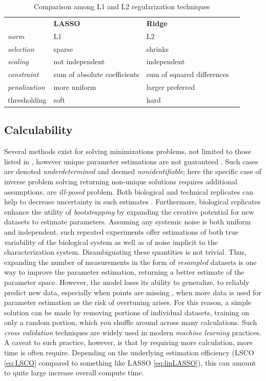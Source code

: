 \begin{table}[H]
\begin{tabular}{|l|l|l|l}
\cline{1-3}
 & \textbf{LASSO} &  \textbf{Ridge} &  \\ \cline{1-3}
\textit{norm} & L1 &  L2 &  \\ \cline{1-3}
\textit{selection} & sparse  & shrinks &  \\ \cline{1-3}
\textit{scaling} & not independent &  independent &  \\ \cline{1-3}
\textit{constraint} &sum of absolute coefficients& sum of squared differences&  \\ \cline{1-3}
\textit{penalization} & more uniform &  larger preferred &  \\ \cline{1-3}
thresholding & soft &  hard &  \\ \cline{1-3}
\end{tabular}
\caption{Comparison among L1 and L2 regularization techniques}
\label{table:regularization}
\end{table}

\subsection{Calculability}
\label{sec:calc}
Several methods exist for solving minimizations problems, not limited to those listed in , however unique parameter estimations are not guaranteed \citep{candes2009near}. Such cases are denoted \emph{underdetermined} and deemed \emph{nonidentifiable}; here the specific case of inverse problem solving returning non-unique solutions requires additional assumptions, \ie are \emph{ill-posed} problem. Both biological and technical replicates can help to decrease uncertainty in such estimates \citep{lee2000importance}. Furthermore, biological replicates enhance the utility of \emph{bootstrapping} by expanding the creative potential for new datasets to estimate parameters. Assuming any systemic noise is both uniform and independent, such repeated experiments offer estimations of both true variability of the biological system as well as of noise implicit to the characterization system. Disambiguating these quantities is not trivial. Thus, expanding the number of measurements in the form of \emph{resampled} datasets is one way to improve the parameter estimation, returning a better estimate of the parameter space. However, the model loses its ability to generalize, \ie to reliably predict new data, especially when points are missing \citep{folch2015enabling}, when more data is used for parameter estimation as the risk of overtuning arises. For this reason, a simple solution can be made by removing portions of individual datasets, training on only a random portion, which you shuffle around across many calculations. Such \emph{cross validation} techniques are widely used in modern \emph{machine learning} practices. A caveat to such practice, however, is that by requiring more calculation, more time is often require. Depending on the underlying estimation efficiency (LSCO \cref{eq:LSCO} compared to something like LASSO \cref{eq:linLASSO}), this can amount to quite large increase overall compute time.


